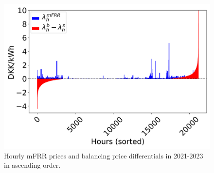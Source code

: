 \documentclass[sigconf]{acmart}
\begin{document}
\begin{figure}[t]
    \centering
    \includegraphics[width=\columnwidth]{figures/mfrr_prices.png}
    \caption{Hourly mFRR prices and balancing price differentials in 2021-2023 in ascending order.}
    \label{fig:mfrr_prices_2022}
\end{figure}
\end{document}
